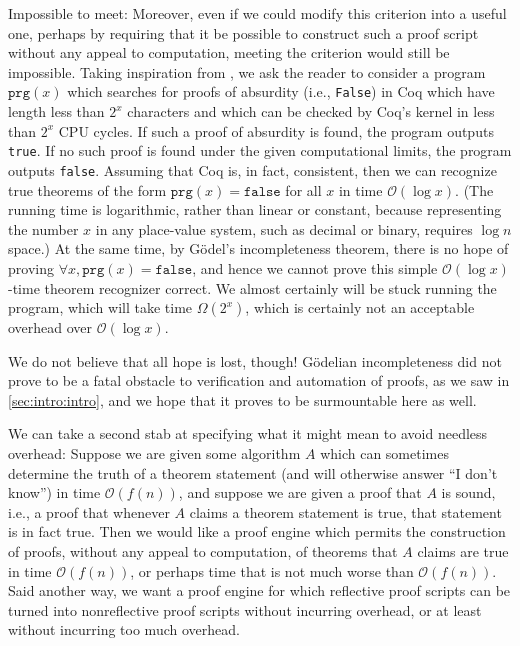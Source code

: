 Impossible to meet:
Moreover, even if we could modify this criterion into a useful one, perhaps by requiring that it be possible to construct such a proof script without any appeal to computation, meeting the criterion would still be impossible.
Taking inspiration from \textcite[pp.~24--25]{Logical2016Garrabrant}, we ask the reader to consider a program $\texttt{prg}(x)$ which searches for proofs of absurdity (i.e., \texttt{False}) in Coq which have length less than $2^x$ characters and which can be checked by Coq's kernel in less than $2^x$ CPU cycles.
If such a proof of absurdity is found, the program outputs \texttt{true}.
If no such proof is found under the given computational limits, the program outputs \texttt{false}.
Assuming that Coq is, in fact, consistent, then we can recognize true theorems of the form $\texttt{prg}(x) = \texttt{false}$ for all $x$ in time $\mathcal O(\log x)$.
(The running time is logarithmic, rather than linear or constant, because representing the number $x$ in any place-value system, such as decimal or binary, requires $\log n$ space.)
At the same time, by Gödel's incompleteness theorem, there is no hope of proving $\forall x, \texttt{prg}(x) = \texttt{false}$, and hence we cannot prove this simple $\mathcal O(\log x)$-time theorem recognizer correct.
We almost certainly will be stuck running the program, which will take time $\Omega(2^x)$, which is certainly not an acceptable overhead over $\mathcal O(\log x)$.

We do not believe that all hope is lost, though!
Gödelian incompleteness did not prove to be a fatal obstacle to verification and automation of proofs, as we saw in \autoref{sec:intro:intro}, and we hope that it proves to be surmountable here as well.

We can take a second stab at specifying what it might mean to avoid needless overhead:
Suppose we are given some algorithm $A$ which can sometimes determine the truth of a theorem statement (and will otherwise answer ``I don't know'') in time $\mathcal O(f(n))$, and suppose we are given a proof that $A$ is sound, i.e., a proof that whenever $A$ claims a theorem statement is true, that statement is in fact true.
Then we would like a proof engine which permits the construction of proofs, without any appeal to computation, of theorems that $A$ claims are true in time $\mathcal O(f(n))$, or perhaps time that is not much worse than $\mathcal O(f(n))$.
Said another way, we want a proof engine for which reflective proof scripts can be turned into nonreflective proof scripts without incurring overhead, or at least without incurring too much overhead.

